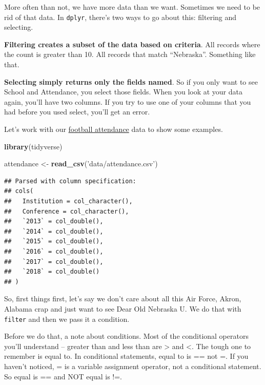 \documentclass[
]{book}
\newenvironment{Shaded}{\begin{snugshade}}{\end{snugshade}}
\newcommand{\KeywordTok}[1]{\textcolor[rgb]{0.13,0.29,0.53}{\textbf{#1}}}
\newcommand{\NormalTok}[1]{#1}
\newcommand{\StringTok}[1]{\textcolor[rgb]{0.31,0.60,0.02}{#1}}
\begin{document}
More often than not, we have more data than we want. Sometimes we need to be rid of that data. In \texttt{dplyr}, there's two ways to go about this: filtering and selecting.

\textbf{Filtering creates a subset of the data based on criteria}. All records where the count is greater than 10. All records that match ``Nebraska''. Something like that.

\textbf{Selecting simply returns only the fields named}. So if you only want to see School and Attendance, you select those fields. When you look at your data again, you'll have two columns. If you try to use one of your columns that you had before you used select, you'll get an error.

Let's work with our \href{https://unl.box.com/s/oajabnn5614s22jstgcd9ojxo2njn6jt}{football attendance} data to show some examples.

\begin{Shaded}
\begin{Highlighting}[]
\KeywordTok{library}\NormalTok{(tidyverse)}
\end{Highlighting}
\end{Shaded}

\begin{Shaded}
\begin{Highlighting}[]
\NormalTok{attendance <-}\StringTok{ }\KeywordTok{read_csv}\NormalTok{(}\StringTok{'data/attendance.csv'}\NormalTok{)}
\end{Highlighting}
\end{Shaded}

\begin{verbatim}
## Parsed with column specification:
## cols(
##   Institution = col_character(),
##   Conference = col_character(),
##   `2013` = col_double(),
##   `2014` = col_double(),
##   `2015` = col_double(),
##   `2016` = col_double(),
##   `2017` = col_double(),
##   `2018` = col_double()
## )
\end{verbatim}

So, first things first, let's say we don't care about all this Air Force, Akron, Alabama crap and just want to see Dear Old Nebraska U. We do that with \texttt{filter} and then we pass it a condition.

Before we do that, a note about conditions. Most of the conditional operators you'll understand -- greater than and less than are \textgreater{} and \textless. The tough one to remember is equal to. In conditional statements, equal to is == not =. If you haven't noticed, = is a variable assignment operator, not a conditional statement. So equal is == and NOT equal is !=.
\end{document}
